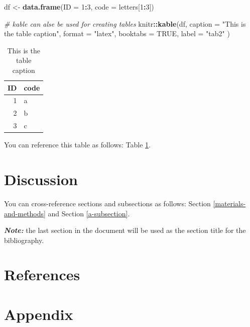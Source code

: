\documentclass[12pt,halfline,a4paper,]{ouparticle}
\newenvironment{Shaded}{\begin{snugshade}}{\end{snugshade}}
\newcommand{\AttributeTok}[1]{\textcolor[rgb]{0.13,0.29,0.53}{#1}}
\newcommand{\CommentTok}[1]{\textcolor[rgb]{0.56,0.35,0.01}{\textit{#1}}}
\newcommand{\ConstantTok}[1]{\textcolor[rgb]{0.56,0.35,0.01}{#1}}
\newcommand{\DecValTok}[1]{\textcolor[rgb]{0.00,0.00,0.81}{#1}}
\newcommand{\FunctionTok}[1]{\textcolor[rgb]{0.13,0.29,0.53}{\textbf{#1}}}
\newcommand{\NormalTok}[1]{#1}
\newcommand{\OtherTok}[1]{\textcolor[rgb]{0.56,0.35,0.01}{#1}}
\newcommand{\SpecialCharTok}[1]{\textcolor[rgb]{0.81,0.36,0.00}{\textbf{#1}}}
\newcommand{\StringTok}[1]{\textcolor[rgb]{0.31,0.60,0.02}{#1}}
\begin{document}
\begin{Shaded}
\begin{Highlighting}[]
\NormalTok{df }\OtherTok{\textless{}{-}} \FunctionTok{data.frame}\NormalTok{(}\AttributeTok{ID =} \DecValTok{1}\SpecialCharTok{:}\DecValTok{3}\NormalTok{, }\AttributeTok{code =}\NormalTok{ letters[}\DecValTok{1}\SpecialCharTok{:}\DecValTok{3}\NormalTok{])}

\CommentTok{\# kable can alse be used for creating tables}
\NormalTok{knitr}\SpecialCharTok{::}\FunctionTok{kable}\NormalTok{(df,}
  \AttributeTok{caption =} \StringTok{"This is the table caption"}\NormalTok{, }\AttributeTok{format =} \StringTok{"latex"}\NormalTok{,}
  \AttributeTok{booktabs =} \ConstantTok{TRUE}\NormalTok{, }\AttributeTok{label =} \StringTok{"tab2"}
\NormalTok{)}
\end{Highlighting}
\end{Shaded}

\begin{table}

\caption{\label{tab:tab2}This is the table caption}
\centering
\begin{tabular}[t]{rl}
\toprule
ID & code\\
\midrule
1 & a\\
2 & b\\
3 & c\\
\bottomrule
\end{tabular}
\end{table}

You can reference this table as follows: Table \ref{tab:tab2}.

\hypertarget{discussion}{%
\section{Discussion}\label{discussion}}

You can cross-reference sections and subsections as follows: Section
\ref{materials-and-methods} and Section \ref{a-subsection}.

\textbf{\emph{Note:}} the last section in the document will be used as
the section title for the bibliography.

\hypertarget{references}{%
\section{References}\label{references}}

\newpage

\hypertarget{appendix}{%
\section{Appendix}\label{appendix}}
\end{document}
